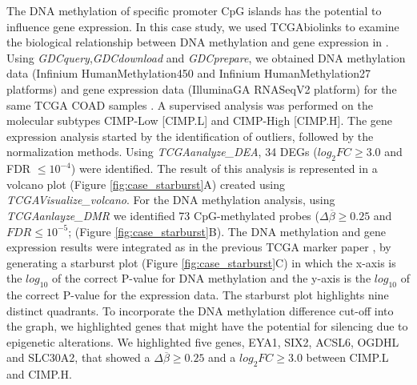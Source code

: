 The DNA methylation of specific promoter CpG islands has the potential to influence gene expression.
In this case study, we used TCGAbiolinks to examine the biological relationship between DNA methylation
and gene expression in . Using \textit{GDCquery},\textit{GDCdownload}
and \textit{GDCprepare}, we obtained DNA methylation data (Infinium HumanMethylation450 and Infinium
HumanMethylation27 platforms) and gene expression data (IlluminaGA RNASeqV2 platform) for the same
TCGA COAD samples \cite{cancer2012comprehensive}. A supervised analysis was performed on the molecular
subtypes CIMP-Low [CIMP.L] and CIMP-High [CIMP.H].
The gene expression analysis started by the identification of outliers, followed by the normalization methods.
 Using \textit{TCGAanalyze\_DEA}, 34 DEGs ($log_2FC\geq 3.0$ and FDR $\leq 10^{-4}$) were identified.
 The result of this analysis is represented in a volcano plot (Figure \ref{fig:case_starburst}A)
 created using \textit{TCGAVisualize\_volcano}.
For the DNA methylation analysis,
using \textit{TCGAanlayze\_DMR} we identified 73 CpG-methylated probes ($\Delta\overline{\beta}\geq 0.25$ and  $FDR \leq 10^{-5}$;  (Figure \ref{fig:case_starburst}B). The DNA methylation and gene expression results were integrated as in the previous TCGA marker paper \cite{noushmehr2010identification,cancer2012comprehensive}, by generating a starburst plot (Figure \ref{fig:case_starburst}C) in which the x-axis is the $log_{10}$ of the correct P-value for DNA methylation and the y-axis is the $log_{10}$ of the correct P-value for the expression data.
The starburst plot highlights nine distinct quadrants.
To incorporate the DNA methylation difference cut-off into the  graph,
we highlighted genes that might have the potential for silencing due to epigenetic alterations.
 We highlighted five genes, EYA1, SIX2, ACSL6, OGDHL and SLC30A2, that showed a $\Delta\overline{\beta}\geq0.25$
 and a $log_2FC\geq 3.0$ between CIMP.L and CIMP.H.



